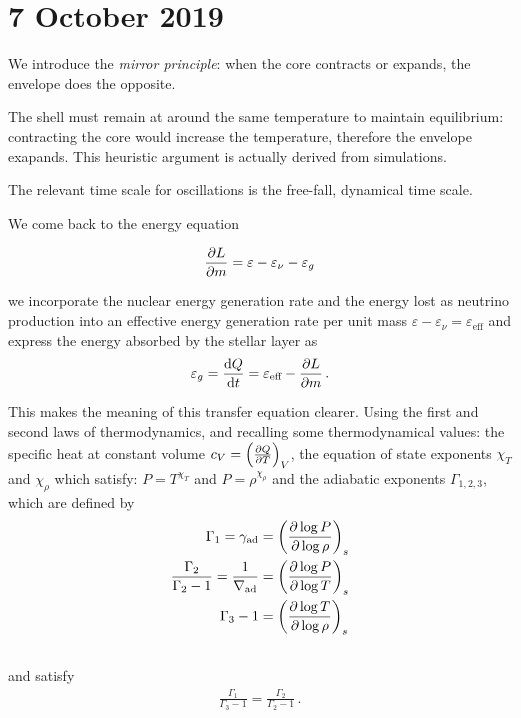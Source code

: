 \documentclass[main.tex]{subfiles}
\begin{document}
\section*{7 October 2019}



We introduce the \emph{mirror principle}: when the core contracts or expands, the envelope does the opposite.

The shell must remain at around the same temperature to maintain equilibrium: contracting the core would increase the temperature, therefore the envelope exapands.
This heuristic argument is actually derived from simulations.

The relevant time scale for oscillations is the free-fall, dynamical time scale.

We come back to the energy equation

\begin{equation}
  \pdv{L}{m} = \varepsilon - \varepsilon_\nu - \varepsilon_g
\end{equation}

we incorporate the nuclear energy generation rate and the energy lost as neutrino production into an effective energy generation rate per unit mass \(\varepsilon - \varepsilon_\nu = \varepsilon_{\text{eff}} \) and express the energy absorbed by the stellar layer as 
%
\begin{align}
 \varepsilon_g = \dv{Q}{t} = \varepsilon_{\text{eff}} - \pdv{L}{m}
\,.
\end{align}
%

This makes the meaning of this transfer equation clearer.
Using the first and second laws of thermodynamics, and recalling some thermodynamical values: the specific heat at constant volume \(c_V = \qty(\pdv{Q}{T})_V \), the equation of state exponents \(\chi_T \) and \(\chi_\rho
\) which satisfy: \(P = T^{ \chi_{T}}\) and \(P = \rho^{\chi_{\rho }}\) and the adiabatic exponents \(\Gamma_{1,2,3}\), which are defined by 
%
\begin{align}
\Gamma_1 = \gamma_{\text{ad}} &= \qty(\pdv{\log P}{\log \rho })_{s}  \\
\frac{\Gamma_2 }{\Gamma_2 -1} = \frac{1}{\nabla _{\text{ad}}} &= \qty(\pdv{\log P}{\log T})_{s}  \\
\Gamma_3 -1 &= \qty(\pdv{\log T}{\log \rho })_{s}  \\
\,
\end{align}
%
and satisfy 
%
\begin{align}
\frac{\Gamma_1 }{\Gamma_3 -1} = \frac{\Gamma_2 }{\Gamma_2 -1}
\,.
\end{align}
\end{document}
